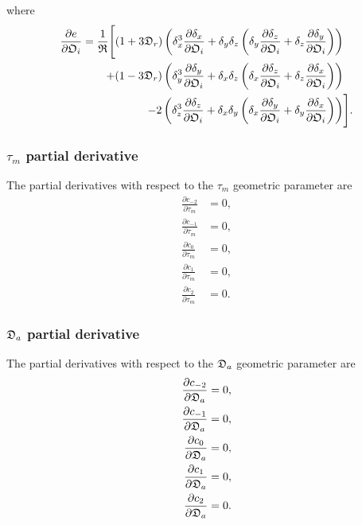 \noindent where
\begin{align}
    \frac{\partial e}{\partial \mathfrak{O}_i}  =  \frac{1}{\mathfrak{R}} \Bigg[
        (1 + 3\mathfrak{D}_r) \left(
            \delta_x^3 \frac{\partial \delta_x}{\partial \mathfrak{O}_i}
            +  \delta_y \delta_z \left( \delta_y \frac{\partial \delta_z}{\partial \mathfrak{O}_i}  +  \delta_z \frac{\partial \delta_y}{\partial \mathfrak{O}_i} \right) \right) & \nonumber \\
        + (1 - 3\mathfrak{D}_r) \left(
            \delta_y^3 \frac{\partial \delta_y}{\partial \mathfrak{O}_i}
            +  \delta_x \delta_z \left( \delta_x \frac{\partial \delta_z}{\partial \mathfrak{O}_i}  +  \delta_z \frac{\partial \delta_x}{\partial \mathfrak{O}_i} \right) \right) & \nonumber \\
        - 2 \left(
            \delta_z^3 \frac{\partial \delta_z}{\partial \mathfrak{O}_i}
            +  \delta_x \delta_y \left( \delta_x \frac{\partial \delta_y}{\partial \mathfrak{O}_i}  +  \delta_y \frac{\partial \delta_x}{\partial \mathfrak{O}_i} \right) \right) &
    \Bigg].
\end{align}


\subsubsection{$\tau_m$ partial derivative}

The partial derivatives with respect to the $\tau_m$ geometric parameter are
\begin{subequations}
\begin{align}
    \frac{\partial c_{-2}}{\partial \tau_m} &= 0, \\
    \frac{\partial c_{-1}}{\partial \tau_m} &= 0, \\
    \frac{\partial c_{0}}{\partial \tau_m}  &= 0, \\
    \frac{\partial c_{1}}{\partial \tau_m}  &= 0, \\
    \frac{\partial c_{2}}{\partial \tau_m}  &= 0.
\end{align}
\end{subequations}


\subsubsection{$\mathfrak{D}_a$ partial derivative}

The partial derivatives with respect to the $\mathfrak{D}_a$ geometric parameter are
\begin{subequations}
\begin{align}
    \frac{\partial c_{-2}}{\partial \mathfrak{D}_a} &= 0, \\
    \frac{\partial c_{-1}}{\partial \mathfrak{D}_a} &= 0, \\
    \frac{\partial c_{0}}{\partial \mathfrak{D}_a}  &= 0, \\
    \frac{\partial c_{1}}{\partial \mathfrak{D}_a}  &= 0, \\
    \frac{\partial c_{2}}{\partial \mathfrak{D}_a}  &= 0.
\end{align}
\end{subequations}


